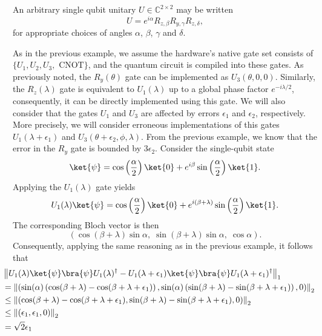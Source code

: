\begin{example}
An arbitrary single qubit unitary $U \in \mathbb{C}^{2 \times 2}$ may be written
\[
U = e^{i\alpha} R_{z,\beta} R_{y,\gamma} R_{z,\delta},
\]
for appropriate choices of angles $\alpha$, $\beta$, $\gamma$ and $\delta$.


As in the previous example, we assume the hardware's native gate set consists of $\{U_1, U_2, U_3,$ $ \text{CNOT}\}$, and the quantum circuit is compiled into these gates.  
As previously noted, the $R_y(\theta)$ gate can be implemented as $U_3(\theta, 0, 0)$.  
Similarly, the $R_z(\lambda)$ gate is equivalent to $U_1(\lambda)$ up to a global phase factor $e^{-i\lambda/2}$, consequently, it can be directly implemented using this gate.  
We will also consider that the gates $U_1$ and $U_3$ are affected by errors $\epsilon_1$ and $\epsilon_2$, respectively. 
More precisely, we will consider erroneous implementations of this gates $U_1(\lambda + \epsilon_1)$ and $U_3(\theta + \epsilon_2, \phi, \lambda)$. 
From the previous example, we know that the error in the $R_y$ gate is bounded by $3 \epsilon_2$. 
Consider the single-qubit state
\[
\ket{\psi} = \cos\left(\frac{\alpha}{2}\right)\ket{0} + e^{i\beta}\sin\left(\frac{\alpha}{2}\right)\ket{1}.
\]
Applying the \( U_1(\lambda) \) gate yields
\[
U_1(\lambda)\ket{\psi} = \cos\left(\frac{\alpha}{2}\right)\ket{0} + e^{i(\beta + \lambda)}\sin\left(\frac{\alpha}{2}\right)\ket{1}.
\]
The corresponding Bloch vector is then
\[
\left(\!\cos(\beta + \lambda)\sin\alpha,\; \sin(\beta + \lambda)\sin\alpha,\; \cos\alpha\right).
\]
Consequently, applying the same reasoning as in the previous example, it follows that
\begin{align*}
  & \hspace{-15pt} \tracenorm{U_1(\lambda) \ket{\psi}\bra{\psi} U_1(\lambda)^\dag - U_1(\lambda + \epsilon_1) \ket{\psi}\bra{\psi}U_1(\lambda + \epsilon_1)^\dag } \\
  & \hspace{-15pt} = \euclideannorm{\left(\sin(\alpha) \left( \cos(\beta + \lambda) -  \cos(\beta + \lambda + \epsilon_1) \right),\sin(\alpha) \left( \sin(\beta + \lambda) -  \sin(\beta + \lambda + \epsilon_1) \right),0 \right)} \\
  & \hspace{-15pt}\leq \euclideannorm{\left( \cos(\beta + \lambda) -  \cos(\beta + \lambda + \epsilon_1) , \sin(\beta + \lambda) -  \sin(\beta + \lambda + \epsilon_1) ,0 \right)} \\
  & \hspace{-15pt} \leq \euclideannorm{\left( \epsilon_1, \epsilon_1 ,0 \right)} \\
  & \hspace{-15pt} = \sqrt{2}\epsilon_1 
\end{align*} 


\end{example}
